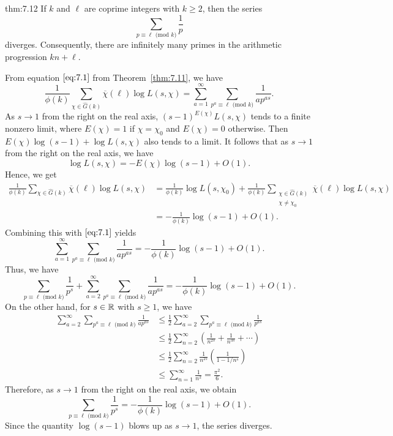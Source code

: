 \begin{theo}{thm:7.12}
    If $k$ and $\ell$ are coprime integers with $k \geq 2$, then the series 
    \[ \sum_{p\equiv\ell\text{ (mod }k)} \frac{1}{p} \] 
    diverges. Consequently, there are infinitely many primes in the 
    arithmetic progression $kn + \ell$. 
\end{theo}
\begin{pf}
    From equation $\eqref{eq:7.1}$ from Theorem~\ref{thm:7.11}, we have 
    \[ \frac{1}{\phi(k)} \sum_{\chi\in\hat G(k)} \overline\chi(\ell) 
    \log L(s, \chi) = \sum_{a=1}^\infty \sum_{p^a\equiv\ell\text{ (mod }k)}
    \frac{1}{ap^{as}}. \] 
    As $s \to 1$ from the right on the real axis, $(s-1)^{E(\chi)} L(s, \chi)$ 
    tends to a finite nonzero limit, where $E(\chi) = 1$ if $\chi = \chi_0$ 
    and $E(\chi) = 0$ otherwise. Then $E(\chi) \log(s-1) + 
    \log L(s, \chi)$ also tends to a limit. It follows that as $s \to 1$ 
    from the right on the real axis, we have 
    \[ \log L(s, \chi) = -E(\chi)\log(s-1) + O(1). \] 
    Hence, we get 
    \begin{align*}
        \frac{1}{\phi(k)} \sum_{\chi\in\hat G(k)} \overline\chi(\ell) \log L(s, \chi)
        &= \frac{1}{\phi(k)} \log L(s, \chi_0) + \frac{1}{\phi(k)} 
        \sum_{\substack{\chi\in\hat G(k) \\ \chi\neq\chi_0}} \overline\chi(\ell) 
        \log L(s, \chi) \\
        &= -\frac{1}{\phi(k)} \log(s-1) + O(1). 
    \end{align*}
    Combining this with $\eqref{eq:7.1}$ yields 
    \[ \sum_{a=1}^\infty \sum_{p^a\equiv\ell\text{ (mod }k)} \frac{1}{ap^{as}} 
    = -\frac{1}{\phi(k)} \log(s-1) + O(1). \] 
    Thus, we have 
    \[ \sum_{p\equiv\ell\text{ (mod }k)} \frac{1}{p^s} + 
    \sum_{a=2}^\infty \sum_{p^a\equiv\ell\text{ (mod }k)} \frac{1}{ap^{as}} 
    = -\frac{1}{\phi(k)} \log(s-1) + O(1). \] 
    On the other hand, for $s \in \mathbb{R}$ with $s \geq 1$, we have 
    \begin{align*}
        \sum_{a=2}^\infty \sum_{p^a\equiv\ell\text{ (mod }k)} \frac{1}{ap^{as}} 
        &\leq \frac12 \sum_{a=2}^\infty \sum_{p^a\equiv\ell\text{ (mod }k)} \frac{1}{p^{as}} \\ 
        &\leq \frac12 \sum_{n=2}^\infty \left( \frac{1}{n^{2s}} + \frac{1}{n^{3s}} + \cdots \right) \\ 
        &\leq \frac12 \sum_{n=2}^\infty \frac{1}{n^{2s}} \left( \frac{1}{1 - 1/n^s} \right) \\ 
        &\leq \sum_{n=1}^\infty \frac{1}{n^2} = \frac{\pi^2}{6}. 
    \end{align*}
    Therefore, as $s \to 1$ from the right on the real axis, we obtain 
    \[ \sum_{p\equiv\ell\text{ (mod }k)} \frac{1}{p^s} = -\frac{1}{\phi(k)} \log(s-1) + O(1). \] 
    Since the quantity $\log(s-1)$ blows up as $s \to 1$, the series diverges. 
\end{pf}


